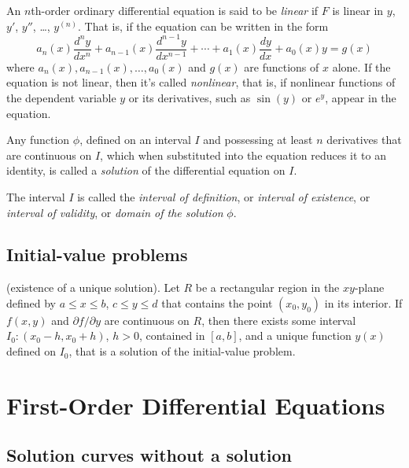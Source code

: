 \documentclass{article}
\begin{document}
An \(n\)th-order ordinary differential equation is said to be \emph{linear} if \(F\) is linear in \(y\), \(y'\), \(y''\), \ldots, \(y^{(n)}\). That is, if the equation can be written in the form
\begin{equation}
    a_n(x) \frac{d^n y}{dx^n} + a_{n-1}(x) \frac{d^{n-1} y}{dx^{n-1}} + \cdots + a_1(x) \frac{dy}{dx} + a_0(x)y = g(x)
\end{equation}
where \(a_n(x), a_{n-1}(x), \ldots, a_0(x)\) and \(g(x)\) are functions of \(x\) alone. If the equation is not linear, then it's called \emph{nonlinear}, that is, if nonlinear functions of the dependent variable \(y\) or its derivatives, such as \(\sin(y)\) or \(e^y\), appear in the equation.

\begin{defn}
    Any function \(\phi\), defined on an interval \(I\) and possessing at least \(n\) derivatives that are continuous on \(I\), which when substituted into the equation reduces it to an identity, is called a \emph{solution} of the differential equation on \(I\).

    The interval \(I\) is called the \emph{interval of definition}, or \emph{interval of existence}, or \emph{interval of validity}, or \emph{domain of the solution} \(\phi\).
\end{defn}

\subsection{Initial-value problems}

\begin{thm} (existence of a unique solution).
    Let \(R\) be a rectangular region in the \(xy\)-plane defined by \(a \leq x \leq b\), \(c \leq y \leq d\) that contains the point \(\left(x_0, y_0\right)\) in its interior. If \(f(x,y)\) and \(\partial{f}/\partial{y}\) are continuous on \(R\), then there exists some interval \(I_0: (x_0 - h, x_0 + h)\), \(h > 0\), contained in \([a, b]\), and a unique function \(y(x)\) defined on \(I_0\), that is a solution of the initial-value problem. 
\end{thm}

\section{First-Order Differential Equations}

\subsection{Solution curves without a solution}
\end{document}
